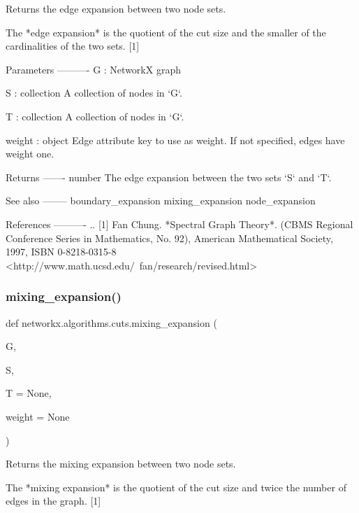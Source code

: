 \begin{DoxyVerb}
\begin{DoxyVerb}Returns the edge expansion between two node sets.

The *edge expansion* is the quotient of the cut size and the smaller
of the cardinalities of the two sets. [1]

Parameters
----------
G : NetworkX graph

S : collection
    A collection of nodes in `G`.

T : collection
    A collection of nodes in `G`.

weight : object
    Edge attribute key to use as weight. If not specified, edges
    have weight one.

Returns
-------
number
    The edge expansion between the two sets `S` and `T`.

See also
--------
boundary_expansion
mixing_expansion
node_expansion

References
----------
.. [1] Fan Chung.
       *Spectral Graph Theory*.
       (CBMS Regional Conference Series in Mathematics, No. 92),
       American Mathematical Society, 1997, ISBN 0-8218-0315-8
       <http://www.math.ucsd.edu/~fan/research/revised.html>\end{DoxyVerb}
 \mbox{\label{namespacenetworkx_1_1algorithms_1_1cuts_ad6d523ba28c915b7f58652949d782d03}} 
\subsubsection{\texorpdfstring{mixing\+\_\+expansion()}{mixing\_expansion()}}
{\footnotesize\ttfamily def networkx.\+algorithms.\+cuts.\+mixing\+\_\+expansion (\begin{DoxyParamCaption}\item[{}]{G,  }\item[{}]{S,  }\item[{}]{T = {\ttfamily None},  }\item[{}]{weight = {\ttfamily None} }\end{DoxyParamCaption})}

\begin{DoxyVerb}Returns the mixing expansion between two node sets.

The *mixing expansion* is the quotient of the cut size and twice the
number of edges in the graph. [1]


\end{DoxyVerb}
\end{DoxyVerb}
